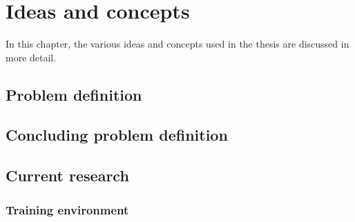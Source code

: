 \chapter{Ideas and concepts}
\label{ch:Ideas-Concepts}

In this chapter, the various ideas and concepts used in the thesis are discussed in more detail.

\section{Problem definition}
\label{sec:Problem-Definition}

\section{Concluding problem definition}
\label{sec:Concluding-Problem-Definition}

\section{Current research}
\label{sec:Current-Research}

\subsection{Training environment}
\label{sub:Training-Environment}
